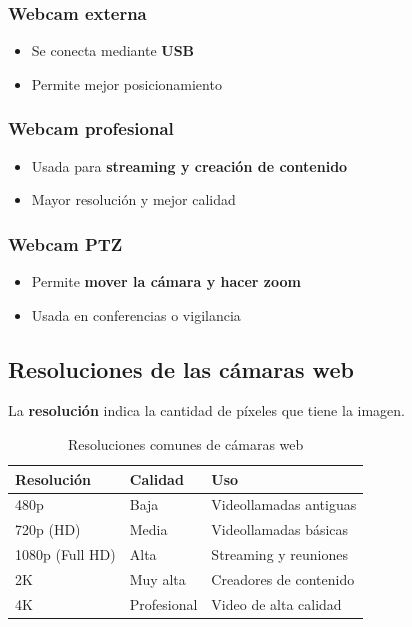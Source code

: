 \documentclass[12pt, letterpaper]{article}
\begin{document}
\subsubsection*{Webcam externa}
\begin{itemize}
  \item Se conecta mediante \textbf{USB}
  \item Permite mejor posicionamiento
\end{itemize}

\subsubsection*{Webcam profesional}
\begin{itemize}
  \item Usada para \textbf{streaming y creación de contenido}
  \item Mayor resolución y mejor calidad
\end{itemize}

\subsubsection*{Webcam PTZ}
\begin{itemize}
  \item Permite \textbf{mover la cámara y hacer zoom}
  \item Usada en conferencias o vigilancia
\end{itemize}

\subsection{Resoluciones de las cámaras web}

La \textbf{resolución} indica la cantidad de píxeles que tiene la imagen.

\begin{table}[h!]
\centering
\begin{tabular}{lll}
\toprule
\textbf{Resolución} & \textbf{Calidad} & \textbf{Uso} \\
\midrule
480p & Baja & Videollamadas antiguas \\
720p (HD) & Media & Videollamadas básicas \\
1080p (Full HD) & Alta & Streaming y reuniones \\
2K & Muy alta & Creadores de contenido \\
4K & Profesional & Video de alta calidad \\
\bottomrule
\end{tabular}
\caption{Resoluciones comunes de cámaras web}
\label{tab:resoluciones}
\end{table}
\end{document}
